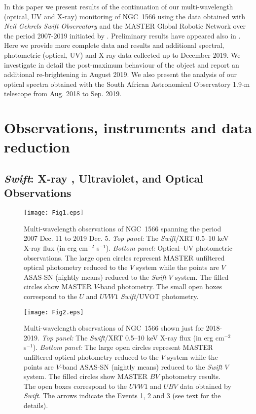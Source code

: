\documentclass[fleqn,usenatbib]{mnras}
\begin{document}
In this paper we present results of the continuation of our multi-wavelength (optical, UV and X-ray) monitoring of NGC~1566 using the data obtained with {\it Neil Gehrels Swift Observatory} and the MASTER Global Robotic Network over the period 2007-2019 initiated by \cite{Oknyansky2019}. Preliminary results have appeared also in \cite{Oknyansky2019b}. Here we provide more complete data and results and additional spectral,  photometric (optical, UV) and X-ray data collected up to December 2019. We investigate in detail the post-maximum  behaviour of the object and report an additional re-brightening in August 2019. We also present the analysis of our optical spectra obtained with the South African Astronomical Observatory 1.9-m telescope from Aug. 2018 to Sep. 2019.

\section{Observations, instruments and data reduction}

\subsection{{\it Swift}: X-ray , Ultraviolet, and Optical Observations}

\begin{figure}
\texttt{[image: Fig1.eps]}
 \caption {Multi-wavelength observations of NGC~1566 spanning the period 2007 Dec. 11 to 2019 Dec. 5. {\it Top panel:} The {\it Swift}/XRT 0.5--10 keV  X-ray flux (in erg cm$^{-2}$ s$^{-1}$). {\it Bottom panel:} Optical--UV photometric observations. The large open circles represent MASTER unfiltered optical photometry reduced to the $V$ system while the points are $V$ ASAS-SN (nightly means) reduced to the {\it Swift} $V$ system. The filled circles show MASTER $V$-band photometry. The small open boxes correspond to the $U$ and $UVW1$ {\it Swift}/UVOT photometry.}
    \label{fig1}
\end{figure}


\begin{figure}
\texttt{[image: Fig2.eps]}
 \caption{Multi-wavelength observations of NGC~1566 shown just for 2018-2019. {\it Top panel:} The {\it Swift}/XRT 0.5--10 keV X-ray flux (in erg cm$^{-2}$ s$^{-1}$). {\it Bottom panel:} The large open circles represent MASTER unfiltered optical photometry reduced to the $V$ system while the points are $V$-band ASAS-SN (nightly means) reduced to the {\it Swift} $V$ system. The filled circles show MASTER $BV$ photometry results. The open boxes correspond to the $UVW1$ and $UBV$ data obtained by {\it Swift}. The arrows indicate the Events 1, 2 and 3 (see text for the details).}
    \label{fig2}
\end{figure}
\end{document}
